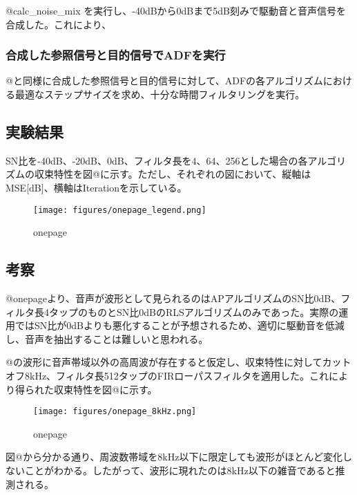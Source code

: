 @calc\_noise\_mix
を実行し、-40dBから0dBまで5dB刻みで駆動音と音声信号を合成した。これにより、

\hypertarget{ux5408ux6210ux3057ux305fux53c2ux7167ux4fe1ux53f7ux3068ux76eeux7684ux4fe1ux53f7ux3067adfux3092ux5b9fux884c}{%
\subsubsection{合成した参照信号と目的信号でADFを実行}\label{ux5408ux6210ux3057ux305fux53c2ux7167ux4fe1ux53f7ux3068ux76eeux7684ux4fe1ux53f7ux3067adfux3092ux5b9fux884c}}

@と同様に合成した参照信号と目的信号に対して、ADFの各アルゴリズムにおける最適なステップサイズを求め、十分な時間フィルタリングを実行。

\hypertarget{ux5b9fux9a13ux7d50ux679c}{%
\subsection{実験結果}\label{ux5b9fux9a13ux7d50ux679c}}

SN比を-40dB、-20dB、0dB、フィルタ長を4、64、256とした場合の各アルゴリズムの収束特性を図@に示す。ただし、それぞれの図において、縦軸はMSE{[}dB{]}、横軸はIterationを示している。

\begin{figure}
\centering
\texttt{[image: figures/onepage\_legend.png]}
\caption{onepage}
\end{figure}

\hypertarget{ux8003ux5bdf}{%
\subsection{考察}\label{ux8003ux5bdf}}

@onepageより、音声が波形として見られるのはAPアルゴリズムのSN比0dB、フィルタ長4タップのものとSN比0dBのRLSアルゴリズムのみであった。実際の運用ではSN比が0dBよりも悪化することが予想されるため、適切に駆動音を低減し、音声を抽出することは難しいと思われる。

@の波形に音声帯域以外の高周波が存在すると仮定し、収束特性に対してカットオフ8kHz、フィルタ長512タップのFIRローパスフィルタを適用した。これにより得られた収束特性を図@に示す。

\begin{figure}
\centering
\texttt{[image: figures/onepage\_8kHz.png]}
\caption{onepage}
\end{figure}

図@から分かる通り、周波数帯域を8kHz以下に限定しても波形がほとんど変化しないことがわかる。したがって、波形に現れたのは8kHz以下の雑音であると推測される。

